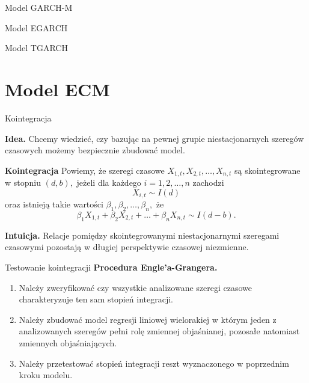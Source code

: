 \documentclass[a4paper, 11pt]{beamer}
\begin{document}
	\begin{frame}{Model GARCH-M}
	\end{frame}
	
	\begin{frame}{Model EGARCH}
	\end{frame}
	
	\begin{frame}{Model TGARCH}
	\end{frame}
	
	\section{Model ECM}
	
	\begin{frame}{Kointegracja}
		\begin{alert}{\textbf{Idea.}}
			Chcemy wiedzieć, czy bazując na pewnej grupie niestacjonarnych 
			szeregów czasowych możemy bezpiecznie zbudować model.
		\end{alert}
		\begin{block}{\textbf{Kointegracja}}
			Powiemy, że szeregi czasowe $X_{1,t}, X_{2,t}, \ldots, X_{n,t}$ są skointegrowane w stopniu $\left(d,b\right),$ jeżeli dla każdego $i=1,2,\ldots,n$ zachodzi \[
				X_{i,t} \sim I\left(d\right)
			\] oraz istnieją takie wartości $\beta_1,\beta_2,\ldots,\beta_n,$ że \[
				\beta_1 X_{1,t} + \beta_2 X_{2,t} + \ldots + \beta_n X_{n,t} \sim I\left(d - b\right).
			\]
		\end{block}
		\begin{alert}{\textbf{Intuicja.}}
			Relacje pomiędzy skointegrowanymi niestacjonarnymi szeregami 
			czasowymi pozostają w długiej perspektywie czasowej niezmienne.
		\end{alert}
	\end{frame}
	
	\begin{frame}{Testowanie kointegracji}
		\textbf{Procedura Engle'a-Grangera.}
		\begin{enumerate}
			\item Należy zweryfikować czy wszystkie analizowane szeregi czasowe 
				charakteryzuje ten sam stopień integracji.
			\item Należy zbudować model regresji liniowej wielorakiej w którym 
				jeden z analizowanych szeregów pełni rolę zmiennej objaśnianej, 
				pozosałe natomiast zmiennych objaśniających.
			\item Należy przetestować stopień integracji reszt wyznaczonego w 
				poprzednim kroku modelu.
		\end{enumerate}
	\end{frame}
	
\end{document}
